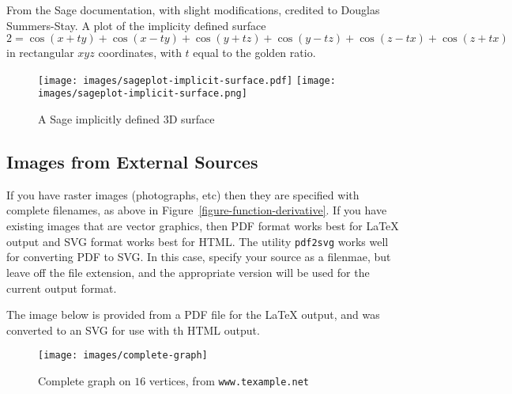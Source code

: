 \documentclass[10pt,]{article}
\theoremstyle{plain}
\theoremstyle{definition}
\theoremstyle{definition}
\theoremstyle{definition}
\theoremstyle{definition}
\theoremstyle{definition}
\theoremstyle{definition}
\numberwithin{equation}{section}
\begin{document}
\par
\hypertarget{p-267}{}%
From the Sage documentation, with slight modifications, credited to Douglas Summers-Stay.  A plot of the implicity defined surface%
\begin{equation*}
2 = \cos(x + ty) + \cos(x - ty) + \cos(y + tz) + \cos(y - tz) + \cos(z - tx) + \cos(z + tx)
\end{equation*}
in rectangular \(xyz\) coordinates, with \(t\) equal to the golden ratio.%
\begin{figure}
\centering
{}%
{\texttt{[image: images/sageplot-implicit-surface.pdf]}}%
{\texttt{[image: images/sageplot-implicit-surface.png]}}
\caption{A Sage implicitly defined 3D surface\label{figure-sage-implicit-surface}}
\end{figure}
\typeout{************************************************}
\typeout{************************************************}
\subsection[{Images from External Sources}]{Images from External Sources}\label{subsection-23}
\hypertarget{p-268}{}%
If you have raster images (photographs, etc) then they are specified with complete filenames, as above in Figure~\hyperref[figure-function-derivative]{\ref{figure-function-derivative}}.  If you have existing images that are vector graphics, then PDF format works best for \LaTeX{} output and SVG format works best for HTML.  The utility \lstinline?pdf2svg? works well for converting PDF to SVG.  In this case, specify your source as a filenmae, but leave off the file extension, and the appropriate version will be used for the current output format.%
\par
\hypertarget{p-269}{}%
The image below is provided from a PDF file for the \LaTeX{} output, and was converted to an SVG for use with th HTML output.%
\begin{figure}
\centering
\texttt{[image: images/complete-graph]}
\caption{Complete graph on \(16\) vertices, from \lstinline?www.texample.net?\label{figure-complete-graph}}
\end{figure}
\typeout{************************************************}
\typeout{************************************************}
\end{document}
